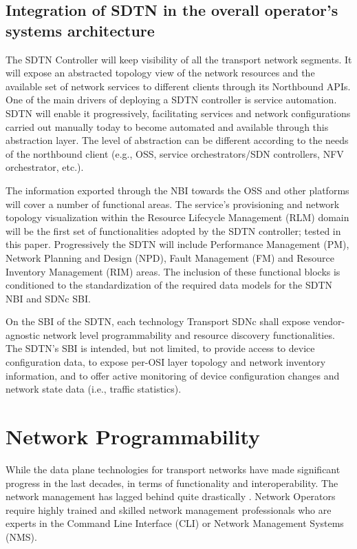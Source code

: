 \documentclass[a4paper,fleqn]{cas-dc}
\begin{document}
\subsection{Integration of SDTN in the overall operator’s systems architecture}
\label{section:sdtn}
The SDTN Controller will keep visibility of all the transport network segments. It will expose an abstracted topology view of the network resources and the available set of network services to different clients through its Northbound APIs.  
One of the main drivers of deploying a SDTN controller is service automation. SDTN will enable it progressively, facilitating services and network configurations carried out manually today to become automated and available through this abstraction layer.  The level of abstraction can be different according to the needs of the northbound client (e.g., OSS, service orchestrators/SDN controllers, NFV orchestrator, etc.). 

The information exported through the NBI towards the OSS and other platforms will cover a number of functional areas. The service’s provisioning and network topology visualization within the Resource Lifecycle Management (RLM) domain will be the first set of functionalities adopted by the SDTN controller; tested in this paper. Progressively the SDTN will include Performance Management (PM), Network Planning and Design (NPD), Fault Management (FM) and Resource Inventory Management (RIM) areas. The inclusion of these functional blocks is conditioned to the standardization of the required data models for the SDTN NBI and SDNc SBI.

On the SBI of the SDTN, each technology Transport SDNc shall expose vendor-agnostic network level programmability and resource discovery functionalities. The SDTN's SBI is intended, but not limited, to provide access to device configuration data, to expose per-OSI layer topology and network inventory information, and to offer active monitoring of device configuration changes and network state data (i.e., traffic statistics). 

\section{Network Programmability}
\label{section:net}

While the data plane technologies for transport networks have made significant progress in the last decades, in terms of functionality and interoperability. The network management has lagged behind quite drastically \cite{claise2019network,edelman2018network}. Network Operators require highly trained and skilled network management professionals who are experts in the Command Line Interface (CLI) or Network Management Systems (NMS). 
\end{document}
